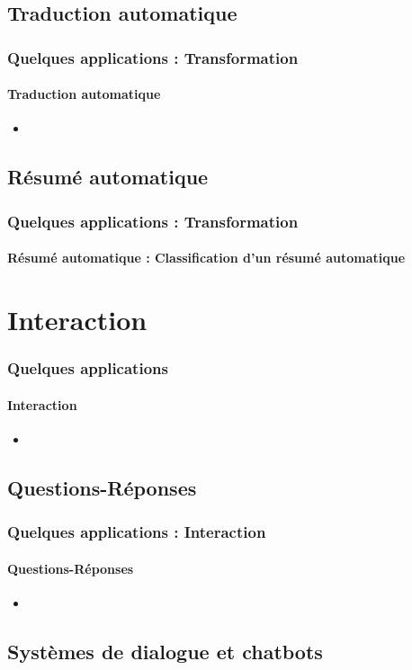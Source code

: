 \documentclass[xcolor=table]{beamer}
\begin{document}
\subsection{Traduction automatique}

\begin{frame}
	\frametitle{Quelques applications : Transformation}
	\framesubtitle{Traduction automatique}
	\begin{itemize}
		\item 
	\end{itemize}
\end{frame}

\subsection{Résumé automatique}

\begin{frame}
	\frametitle{Quelques applications : Transformation}
	\framesubtitle{Résumé automatique : Classification d'un résumé automatique}
\end{frame}


\section{Interaction}

\begin{frame}
	\frametitle{Quelques applications}
	\framesubtitle{Interaction}
	\begin{itemize}
		\item 
	\end{itemize}
\end{frame}

\subsection{Questions-Réponses}

\begin{frame}
	\frametitle{Quelques applications : Interaction}
	\framesubtitle{Questions-Réponses}
	\begin{itemize}
		\item 
	\end{itemize}
\end{frame}

\subsection{Systèmes de dialogue et chatbots}
\end{document}
